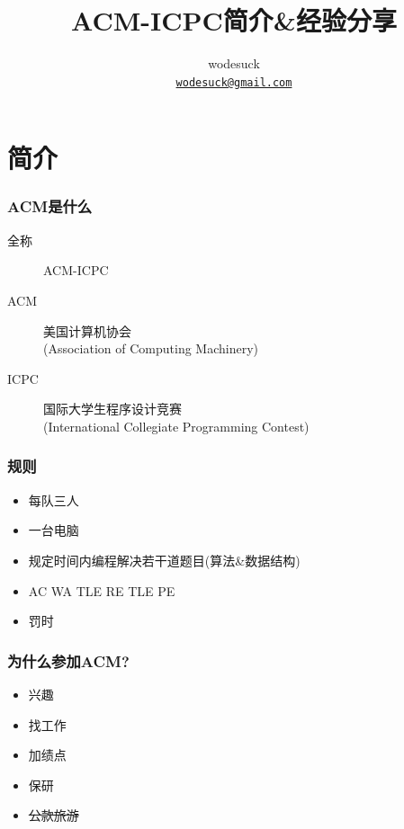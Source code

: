 \documentclass[slidestop,compress,mathserif]{beamer}
\title{ACM-ICPC简介\&经验分享}
\author[wodesuck]
{wodesuck\\ \href{mailto:wodesuck@gmail.com}{{\tt wodesuck@gmail.com}}}
\institute[SYSU\_ArthasMenethil]{SYSU\_ArthasMenethil}
\begin{document}
  {\aauwavesbg
  \begin{frame}
    \titlepage
  \end{frame}}

  \section{简介}
  \begin{frame}
    \frametitle{ACM是什么}
    \begin{description}
      \item[全称] ACM-ICPC
      \item[ACM] 美国计算机协会\\(Association of Computing Machinery)
      \item[ICPC] 国际大学生程序设计竞赛\\(International Collegiate Programming Contest)
    \end{description}
  \end{frame}
  \begin{frame}
    \frametitle{规则}
    \begin{itemize}
      \pause \item 每队三人
      \pause \item 一台电脑
      \pause \item 规定时间内编程解决若干道题目(算法\&数据结构)
      \pause \item AC WA TLE RE TLE PE
      \pause \item 罚时
    \end{itemize}
  \end{frame}
  \begin{frame}
    \frametitle{为什么参加ACM?}
    \begin{itemize}
      \pause \item 兴趣
      \pause \item 找工作
      \pause \item 加绩点
      \pause \item 保研
      \pause \item \sout{公款旅游}
    \end{itemize}
  \end{frame}
\end{document}
